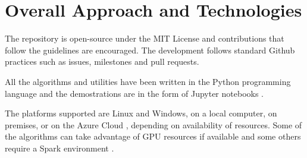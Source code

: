 \section{Overall Approach and Technologies}

The repository is open-source under the MIT License and contributions that follow the guidelines are encouraged.  
The development follows standard Github practices such as issues, milestones and pull requests.

All the algorithms and utilities have been written in the Python programming language and the demostrations are 
in the form of Jupyter notebooks \cite{jupyter}.

The platforms supported are Linux and Windows, on a local computer, on premises, or on the Azure Cloud \cite{azure}, depending on availability of resources.
Some of the algorithms can take advantage of GPU resources if available and some others require a Spark environment \cite{spark}.
